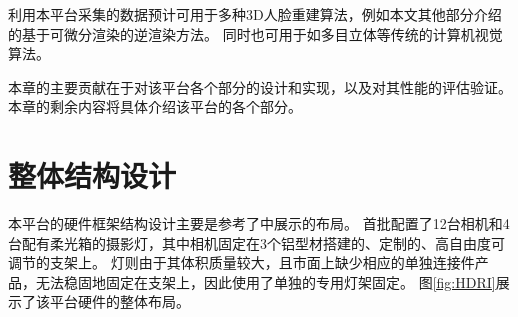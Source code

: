 利用本平台采集的数据预计可用于多种3D人脸重建算法，例如本文其他部分介绍的基于可微分渲染的逆渲染方法。
同时也可用于如多目立体等传统的计算机视觉算法。

本章的主要贡献在于对该平台各个部分的设计和实现，以及对其性能的评估验证。
本章的剩余内容将具体介绍该平台的各个部分。

\section{整体结构设计}

本平台的硬件框架结构设计主要是参考了\citet{RiviereGBGB20}中展示的布局。
首批配置了12台相机和4台配有柔光箱的摄影灯，其中相机固定在3个铝型材搭建的、定制的、高自由度可调节的支架上。
灯则由于其体积质量较大，且市面上缺少相应的单独连接件产品，无法稳固地固定在支架上，因此使用了单独的专用灯架固定。
图\ref{fig:HDRI}展示了该平台硬件的整体布局。

